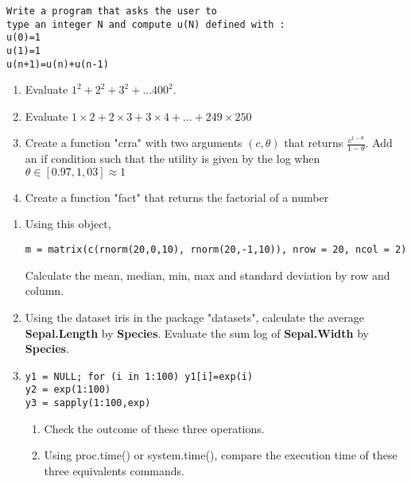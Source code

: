 \documentclass[11pt,a4paper]{article}
\newcommand{\1}{\mathbb{1}}
\begin{document}
\begin{Exercise}[title = Programming]
\begin{verbatim}
Write a program that asks the user to 
type an integer N and compute u(N) defined with :
u(0)=1
u(1)=1
u(n+1)=u(n)+u(n-1)
 \end{verbatim}

\begin{enumerate}
\item Evaluate  $1^2 + 2^2 +3^2 + \ldots 400^2$.
\item Evaluate $1 \times 2+2\times3+3\times4+ ... + 249\times250$
\item Create a function "crra" with two arguments $(c,\theta)$ that returns $\frac{c^{1-\theta}}{1-\theta}$. Add an if condition such that the utility is given by the log when $\theta \in [0.97,1,03] \approx 1$
\item  Create a function "fact" that returns the factorial of a number
\end{enumerate}
\end{Exercise}



\begin{Exercise}[title = Apply Functions]
\begin{enumerate}
\item Using this object, \begin{verbatim}
m = matrix(c(rnorm(20,0,10), rnorm(20,-1,10)), nrow = 20, ncol = 2)
\end{verbatim} Calculate the mean, median, min, max and standard deviation by row and column.
\item Using the dataset iris in the package "datasets", calculate the average \textbf{Sepal.Length} by \textbf{Species}. Evaluate the sum log of \textbf{Sepal.Width} by \textbf{Species}.
\item \begin{verbatim}
y1 = NULL; for (i in 1:100) y1[i]=exp(i)
y2 = exp(1:100)
y3 = sapply(1:100,exp)
\end{verbatim}
\begin{enumerate}
\item Check the outcome of these three operations.
\item Using proc.time() or system.time(), compare the execution time of these three equivalents commands.
\end{enumerate}
\end{enumerate}
\end{Exercise}
\end{document}
